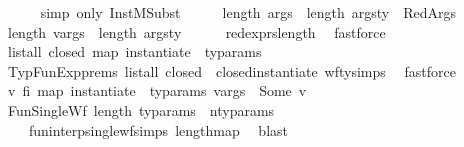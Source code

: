 \begin{isabellebody}
\ \ \ \ \isamarkupfalse%
\ {\isacharparenleft}{\kern0pt}simp\ only{\isacharcolon}{\kern0pt}\ InstMSubst{\isacharparenright}{\kern0pt}\isanewline
\ \ \isamarkupfalse%
\ \isamarkupfalse%
\ {\isacartoucheopen}length\ args\ {\isacharequal}{\kern0pt}\ length\ args{\isacharunderscore}{\kern0pt}ty{\isacartoucheclose}\ \ RedArgs\ \isamarkupfalse%
\ {\isachardoublequoteopen}length\ vargs\ {\isacharequal}{\kern0pt}\ length\ args{\isacharunderscore}{\kern0pt}ty{\isachardoublequoteclose}\isanewline
\ \ \ \ \isamarkupfalse%
\ red{\isacharunderscore}{\kern0pt}exprs{\isacharunderscore}{\kern0pt}length\ \isamarkupfalse%
\ fastforce\isanewline
\ \ \isamarkupfalse%
\ \isamarkupfalse%
\ {\isachardoublequoteopen}list{\isacharunderscore}{\kern0pt}all\ closed\ {\isacharparenleft}{\kern0pt}map\ {\isacharparenleft}{\kern0pt}instantiate\ {\isasymOmega}{\isacharparenright}{\kern0pt}\ ty{\isacharunderscore}{\kern0pt}params{\isacharparenright}{\kern0pt}{\isachardoublequoteclose}\isanewline
\ \ \ \ \isamarkupfalse%
\ TypFunExp{\isachardot}{\kern0pt}prems{\isacharparenleft}{\kern0pt}{}{\isacharparenright}{\kern0pt}\ {\isacartoucheopen}list{\isacharunderscore}{\kern0pt}all\ closed\ {\isasymOmega}{\isacartoucheclose}\ closed{\isacharunderscore}{\kern0pt}instantiate\ wf{\isacharunderscore}{\kern0pt}ty{\isachardot}{\kern0pt}simps{\isacharparenleft}{\kern0pt}{}{\isacharparenright}{\kern0pt}\ \isamarkupfalse%
\ fastforce\isanewline
\ \ \isamarkupfalse%
\ \isamarkupfalse%
\ {\isachardoublequoteopen}{\isasymexists}v{\isachardot}{\kern0pt}\ fi\ {\isacharparenleft}{\kern0pt}map\ {\isacharparenleft}{\kern0pt}instantiate\ {\isasymOmega}{\isacharparenright}{\kern0pt}\ ty{\isacharunderscore}{\kern0pt}params{\isacharparenright}{\kern0pt}\ vargs\ {\isacharequal}{\kern0pt}\ Some\ v{\isachardoublequoteclose}\ \isamarkupfalse%
\ FunSingleWf\ {\isacartoucheopen}length\ ty{\isacharunderscore}{\kern0pt}params\ {\isacharequal}{\kern0pt}\ n{\isacharunderscore}{\kern0pt}ty{\isacharunderscore}{\kern0pt}params{\isacartoucheclose}\isanewline
\ \ \ \ fun{\isacharunderscore}{\kern0pt}interp{\isacharunderscore}{\kern0pt}single{\isacharunderscore}{\kern0pt}wf{\isachardot}{\kern0pt}simps\ length{\isacharunderscore}{\kern0pt}map\ \isamarkupfalse%
\ blast\isanewline
\ \ \isamarkupfalse%

\end{isabellebody}
